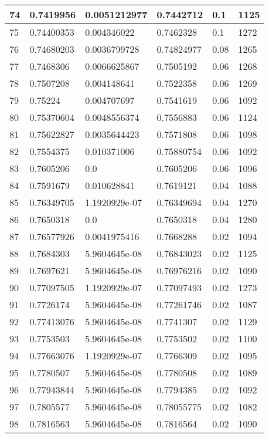\begin{longtable}{|l|l|l|l|l|l|}
74 & 0.7419956 & 0.0051212977 & 0.7442712 & 0.1 & 1125 \\ \hline 
75 & 0.74400353 & 0.004346022 & 0.7462328 & 0.1 & 1272 \\ \hline 
76 & 0.74680203 & 0.0036799728 & 0.74824977 & 0.08 & 1265 \\ \hline 
77 & 0.7468306 & 0.0066625867 & 0.7505192 & 0.06 & 1268 \\ \hline 
78 & 0.7507208 & 0.004148641 & 0.7522358 & 0.06 & 1269 \\ \hline 
79 & 0.75224 & 0.004707697 & 0.7541619 & 0.06 & 1092 \\ \hline 
80 & 0.75370604 & 0.0048556374 & 0.7556883 & 0.06 & 1124 \\ \hline 
81 & 0.75622827 & 0.0035644423 & 0.7571808 & 0.06 & 1098 \\ \hline 
82 & 0.7554375 & 0.010371006 & 0.75880754 & 0.06 & 1092 \\ \hline 
83 & 0.7605206 & 0.0 & 0.7605206 & 0.06 & 1096 \\ \hline 
84 & 0.7591679 & 0.010628841 & 0.7619121 & 0.04 & 1088 \\ \hline 
85 & 0.76349705 & 1.1920929e-07 & 0.76349694 & 0.04 & 1270 \\ \hline 
86 & 0.7650318 & 0.0 & 0.7650318 & 0.04 & 1280 \\ \hline 
87 & 0.76577926 & 0.0041975416 & 0.7668288 & 0.02 & 1094 \\ \hline 
88 & 0.7684303 & 5.9604645e-08 & 0.76843023 & 0.02 & 1125 \\ \hline 
89 & 0.7697621 & 5.9604645e-08 & 0.76976216 & 0.02 & 1090 \\ \hline 
90 & 0.77097505 & 1.1920929e-07 & 0.77097493 & 0.02 & 1273 \\ \hline 
91 & 0.7726174 & 5.9604645e-08 & 0.77261746 & 0.02 & 1087 \\ \hline 
92 & 0.77413076 & 5.9604645e-08 & 0.7741307 & 0.02 & 1129 \\ \hline 
93 & 0.7753503 & 5.9604645e-08 & 0.7753502 & 0.02 & 1100 \\ \hline 
94 & 0.77663076 & 1.1920929e-07 & 0.7766309 & 0.02 & 1095 \\ \hline 
95 & 0.7780507 & 5.9604645e-08 & 0.7780508 & 0.02 & 1089 \\ \hline 
96 & 0.77943844 & 5.9604645e-08 & 0.7794385 & 0.02 & 1092 \\ \hline 
97 & 0.7805577 & 5.9604645e-08 & 0.78055775 & 0.02 & 1082 \\ \hline 
98 & 0.7816563 & 5.9604645e-08 & 0.7816564 & 0.02 & 1090 \\ \hline 

\end{longtable}
